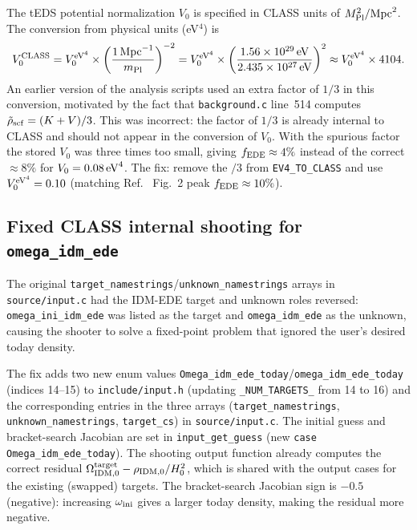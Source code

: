 \documentclass[aps,onecolumn,prd,nofootinbib,superscriptaddress,10pt,longbibliography,floatfix]{revtex4-2}
\newcommand{\mpl}{M_{\rm Pl}}
\begin{document}
The tEDS potential normalization $V_0$ is specified in CLASS units of $\mpl^2/\text{Mpc}^2$. The conversion from physical units (eV$^4$) is
\begin{equation}
V_0^{\rm CLASS} = V_0^{\rm eV^4} \times \left(\frac{1\,\text{Mpc}^{-1}}{m_{\rm Pl}}\right)^{-2} = V_0^{\rm eV^4} \times \left(\frac{1.56\times10^{29}\,\text{eV}}{2.435\times10^{27}\,\text{eV}}\right)^2 \approx V_0^{\rm eV^4} \times 4104.
\end{equation}
An earlier version of the analysis scripts used an extra factor of $1/3$ in this conversion, motivated by the fact that \texttt{background.c} line~514 computes $\tilde{\rho}_{\rm scf} = (K+V)/3$. This was incorrect: the factor of $1/3$ is already internal to CLASS and should not appear in the conversion of $V_0$. With the spurious factor the stored $V_0$ was three times too small, giving $f_{\rm EDE}\approx 4\%$ instead of the correct $\approx 8\%$ for $V_0=0.08\,{\rm eV}^4$. The fix: remove the $/3$ from \texttt{EV4\_TO\_CLASS} and use $V_0^{\rm eV^4}=0.10$ (matching Ref.~\cite{Lin:2022teds} Fig.~2 peak $f_{\rm EDE}\approx10\%$).

\subsection{Fixed CLASS internal shooting for \texttt{omega\_idm\_ede}}

The original \texttt{target\_namestrings}/\texttt{unknown\_namestrings} arrays in \texttt{source/input.c} had the IDM-EDE target and unknown roles reversed: \texttt{omega\_ini\_idm\_ede} was listed as the target and \texttt{omega\_idm\_ede} as the unknown, causing the shooter to solve a fixed-point problem that ignored the user's desired today density.

The fix adds two new enum values \texttt{Omega\_idm\_ede\_today}/\texttt{omega\_idm\_ede\_today} (indices 14--15) to \texttt{include/input.h} (updating \texttt{\_NUM\_TARGETS\_} from 14 to 16) and the corresponding entries in the three arrays (\texttt{target\_namestrings}, \texttt{unknown\_namestrings}, \texttt{target\_cs}) in \texttt{source/input.c}. The initial guess and bracket-search Jacobian are set in \texttt{input\_get\_guess} (new \texttt{case Omega\_idm\_ede\_today}). The shooting output function already computes the correct residual $\Omega_{\rm IDM,0}^{\rm target} - \rho_{\rm IDM,0}/H_0^2$, which is shared with the output cases for the existing (swapped) targets. The bracket-search Jacobian sign is $-0.5$ (negative): increasing $\omega_{\rm ini}$ gives a larger today density, making the residual more negative.
\end{document}
